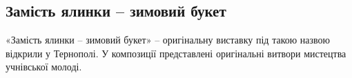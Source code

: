  
 
 
 
 
\subsection{Замість ялинки – зимовий букет}
\label{sec:31_12_2021.stz.news.ua.zzte.1.jalynka_buket}


\begin{zznagolos}
«Замість ялинки – зимовий букет» – оригінальну виставку під такою назвою
відкрили у Тернополі. У композиції представлені оригінальні витвори мистецтва
учнівської молоді.
\end{zznagolos}
